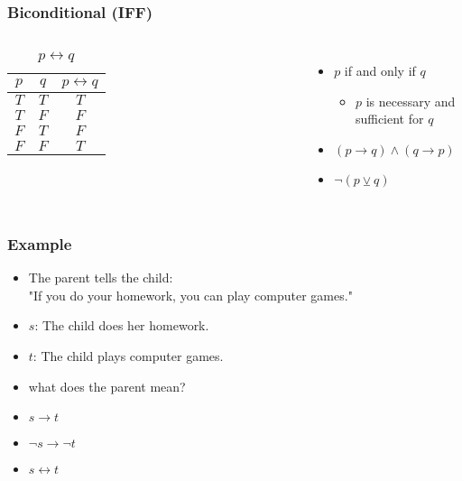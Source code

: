 \documentclass[dvipsnames]{beamer}
\begin{document}
\begin{frame}
  \frametitle{Biconditional (IFF)}

  \begin{columns}
    \begin{table}
      \caption{$p \leftrightarrow q$}
      \begin{tabular}{|c|c||c|}\hline
        $p$ & $q$ & $p \leftrightarrow q$\\\hline\hline
        $T$ & $T$ & $T$\\\hline
        $T$ & $F$ & $F$\\\hline
        $F$ & $T$ & $F$\\\hline
        $F$ & $F$ & $T$\\\hline
      \end{tabular}
    \end{table}

    \begin{itemize}
      \item $p$ if and only if $q$
      \begin{itemize}
        \item $p$ is necessary and sufficient for $q$
      \end{itemize}

      \pause
      \medskip
      \item $(p \rightarrow q) \wedge (q \rightarrow p)$
      \item $\neg (p \veebar q)$
    \end{itemize}
  \end{columns}
\end{frame}

\begin{frame}
  \frametitle{Example}

  \begin{example}
    \begin{itemize}
      \item The parent tells the child:\\
        "If you do your homework, you can play computer games."

      \pause
      \medskip
      \item $s$: The child does her homework.
      \item $t$: The child plays computer games.
      \item what does the parent mean?

      \pause
      \medskip
      \item $s \rightarrow t$
      \pause
      \item $\neg s \rightarrow \neg t$
      \pause
      \item $s \leftrightarrow t$
    \end{itemize}
  \end{example}
\end{frame}
\end{document}
